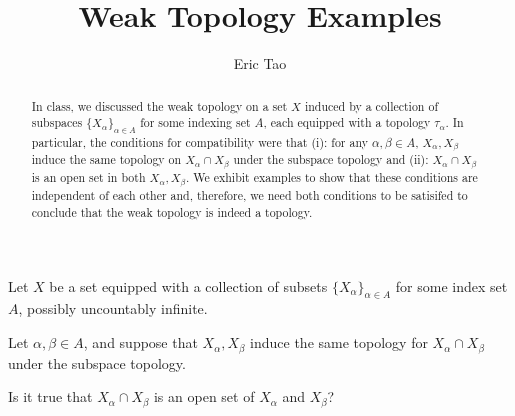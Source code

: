 \documentclass[10pt]{article}
\newenvironment{problem}[2][]{\begin{trivlist}
\item[\hskip \labelsep {\bfseries #1}\hskip \labelsep {\bfseries #2.}]}{\end{trivlist}}
\begin{document}
\title{Weak Topology Examples}
\author{Eric Tao}
\maketitle

\begin{abstract}
In class, we discussed the weak topology on a set $X$ induced by a collection of subspaces $ \{ X_\alpha \}_{\alpha \in A}$ for some indexing set $A$, each equipped with a topology $\tau_\alpha$. In particular, the conditions for compatibility were that (i): for any $\alpha, \beta \in A$, $X_\alpha, X_\beta$ induce the same topology on $X_\alpha \cap X_\beta$ under the subspace topology and (ii): $X_\alpha \cap X_\beta$ is an open set in both $X_\alpha, X_\beta$. We exhibit examples to show that these conditions are independent of each other and, therefore, we need both conditions to be satisifed to conclude that the weak topology is indeed a topology. 
\end{abstract}

\begin{problem}{Question 1}



Let $X$ be a set equipped with a collection of subsets $\{ X_\alpha \}_{\alpha \in A}$ for some index set $A$, possibly uncountably infinite.

Let $\alpha, \beta \in A$, and suppose that $X_\alpha, X_\beta$ induce the same topology for $X_\alpha \cap X_\beta$ under the subspace topology.

Is it true that $X_\alpha \cap X_\beta$ is an open set of $X_\alpha$ and $X_\beta$?

\end{problem}
\end{document}
